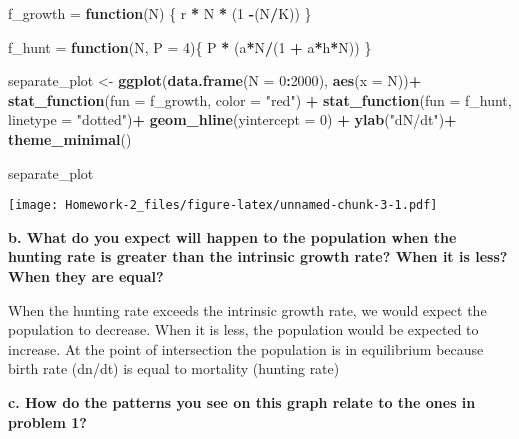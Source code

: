 \documentclass[]{article}
\newenvironment{Shaded}{\begin{snugshade}}{\end{snugshade}}
\newcommand{\KeywordTok}[1]{\textcolor[rgb]{0.13,0.29,0.53}{\textbf{#1}}}
\newcommand{\DataTypeTok}[1]{\textcolor[rgb]{0.13,0.29,0.53}{#1}}
\newcommand{\DecValTok}[1]{\textcolor[rgb]{0.00,0.00,0.81}{#1}}
\newcommand{\StringTok}[1]{\textcolor[rgb]{0.31,0.60,0.02}{#1}}
\newcommand{\ControlFlowTok}[1]{\textcolor[rgb]{0.13,0.29,0.53}{\textbf{#1}}}
\newcommand{\OperatorTok}[1]{\textcolor[rgb]{0.81,0.36,0.00}{\textbf{#1}}}
\newcommand{\NormalTok}[1]{#1}
\begin{document}
\begin{Shaded}
\begin{Highlighting}[]
\NormalTok{f_growth =}\StringTok{ }\ControlFlowTok{function}\NormalTok{(N) \{}
\NormalTok{  r }\OperatorTok{*}\StringTok{ }\NormalTok{N }\OperatorTok{*}\StringTok{ }\NormalTok{(}\DecValTok{1} \OperatorTok{-}\NormalTok{(N}\OperatorTok{/}\NormalTok{K))}
\NormalTok{  \}}

\NormalTok{f_hunt =}\StringTok{ }\ControlFlowTok{function}\NormalTok{(N, }\DataTypeTok{P =} \DecValTok{4}\NormalTok{)\{}
\NormalTok{  P }\OperatorTok{*}\StringTok{ }\NormalTok{(a}\OperatorTok{*}\NormalTok{N}\OperatorTok{/}\NormalTok{(}\DecValTok{1} \OperatorTok{+}\StringTok{ }\NormalTok{a}\OperatorTok{*}\NormalTok{h}\OperatorTok{*}\NormalTok{N))}
\NormalTok{\}}

\NormalTok{separate_plot <-}\StringTok{ }\KeywordTok{ggplot}\NormalTok{(}\KeywordTok{data.frame}\NormalTok{(}\DataTypeTok{N =} \DecValTok{0}\OperatorTok{:}\DecValTok{2000}\NormalTok{), }\KeywordTok{aes}\NormalTok{(}\DataTypeTok{x =}\NormalTok{ N))}\OperatorTok{+}\StringTok{ }
\StringTok{  }\KeywordTok{stat_function}\NormalTok{(}\DataTypeTok{fun =}\NormalTok{ f_growth, }\DataTypeTok{color =} \StringTok{"red"}\NormalTok{) }\OperatorTok{+}
\StringTok{  }\KeywordTok{stat_function}\NormalTok{(}\DataTypeTok{fun =}\NormalTok{ f_hunt, }\DataTypeTok{linetype =} \StringTok{"dotted"}\NormalTok{)}\OperatorTok{+}
\StringTok{  }\KeywordTok{geom_hline}\NormalTok{(}\DataTypeTok{yintercept =} \DecValTok{0}\NormalTok{) }\OperatorTok{+}
\StringTok{  }\KeywordTok{ylab}\NormalTok{(}\StringTok{"dN/dt"}\NormalTok{)}\OperatorTok{+}
\StringTok{  }\KeywordTok{theme_minimal}\NormalTok{()}

  
\NormalTok{separate_plot}
\end{Highlighting}
\end{Shaded}

\texttt{[image: Homework-2\_files/figure-latex/unnamed-chunk-3-1.pdf]}

\textbf{b. What do you expect will happen to the population when the
hunting rate is greater than the intrinsic growth rate? When it is less?
When they are equal?}

When the hunting rate exceeds the intrinsic growth rate, we would expect
the population to decrease. When it is less, the population would be
expected to increase. At the point of intersection the population is in
equilibrium because birth rate (dn/dt) is equal to mortality (hunting
rate)

\textbf{c. How do the patterns you see on this graph relate to the ones
in problem 1?}
\end{document}
